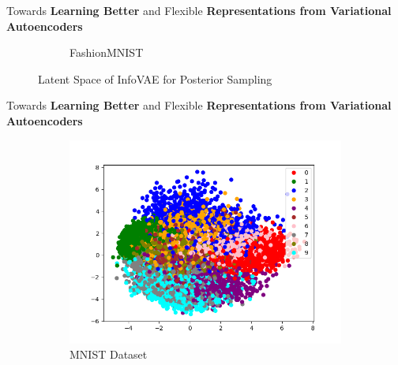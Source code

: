 \documentclass[hyperref={colorlinks,citecolor=blue,linkcolor=blue,urlcolor=blue}]{beamer}
\begin{document}
\begin{frame}{ Towards \textbf{Learning Better} and Flexible \textbf{Representations from Variational Autoencoders} \vspace{0.3em}}
\begin{figure}
\begin{subfigure}[b]{0.4\textwidth}
        \caption{FashionMNIST}
    \end{subfigure}
    \caption{Latent Space of InfoVAE for Posterior Sampling}
  \end{figure}
\end{frame}

\begin{frame}{ Towards \textbf{Learning Better} and Flexible \textbf{Representations from Variational Autoencoders} \vspace{0.3em}}
  \begin{figure}
    \begin{subfigure}[b]{0.4\textwidth}
        \centering
        \includegraphics[width=\textwidth,]{./Images/latent_MNIST_MMD_MAP.png}
        \caption{MNIST Dataset}
    \end{subfigure}
    \begin{subfigure}[b]{0.4\textwidth}
        \centering

\end{subfigure}
\end{figure}
\end{frame}
\end{document}
